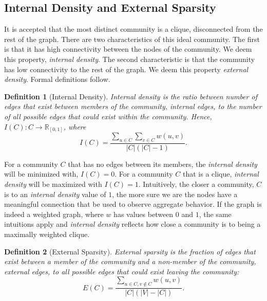 \documentclass[phd,tocprelim]{cornell}
\newtheorem{definition}{Definition}
\begin{document}
\subsection{Internal Density and External Sparsity}

It is accepted that the most distinct community is a clique, disconnected from the rest of the graph.  There are two characteristics of this ideal community.  The first is that it has high connectivity between the nodes of the community.  We deem this property, {\it internal density}.  The second characteristic is that the community has low connectivity to the rest of the graph.  We deem this property {\it external density}.  Formal definitions follow.

\begin{definition}[Internal Density]
Internal density is the ratio between number of edges that exist between members of the community, {\it internal edges}, to the number of all possible edges that could exist within the community.  Hence, $I(C) : C \rightarrow \mathbb{R}_{[0, 1]}$, where
\begin{equation}
 I(C) =\frac{\sum_{u \in C} \sum_{v \in C} w(u,v)}{|C|(|C| - 1)} .
\end{equation}
\label{def_int_density}
\end{definition}

For a community $C$ that has no edges between its members, the {\it internal density} will be minimized with, $I(C) = 0$.  For a community $C$ that is a clique, {\it internal density} will be maximized with $I(C) = 1$.  Intuitively, the closer a community, $C$ is to an {\it internal density} value of $1$, the more sure we are the nodes have a meaningful connection that be used to observe aggregate behavior.  If the graph is indeed a weighted graph, where $w$ has values between $0$ and $1$, the same intuitions apply and {\it internal density} reflects how close a community is to being a maximally weighted clique.

\begin{definition}[External Sparsity]
External sparsity is the fraction of edges that exist between a member of the community and a non-member of the community, {\it external edges}, to all possible edges that could exist leaving the community:
\begin{equation}
 E(C) = \frac{\sum_{u \in C, v \notin C} w(u,v)}{|C|(|V| - |C|)}.
\end{equation}
\label{def_ext_density}
\end{definition}
\end{document}
